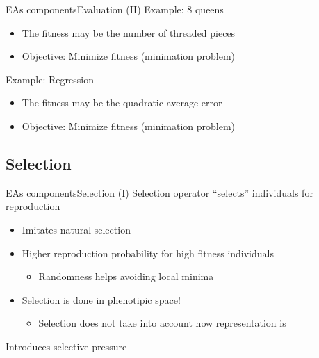 \documentclass[10pt,compress]{beamer} %
\begin{document}
\begin{frame}{EAs components}{Evaluation (II)} 
	Example: 8 queens
	\begin{itemize}
		\item The fitness may be the number of threaded pieces
		\item Objective: Minimize fitness (minimation problem)
	\end{itemize}
	Example: Regression
	\begin{itemize}
		\item The fitness may be the quadratic average error
		\item Objective: Minimize fitness (minimation problem)
	\end{itemize}
\end{frame}

\subsection{Selection}

\begin{frame}{EAs components}{Selection (I)} 
	Selection operator ``selects'' individuals for reproduction
	\begin{itemize}
		\item Imitates natural selection
		\item Higher reproduction probability for high fitness individuals
		\begin{itemize}
			\item Randomness helps avoiding local minima
		\end{itemize}
		\item Selection is done in phenotipic space!
		\begin{itemize}
			\item Selection does not take into account how representation is
		\end{itemize}
	\end{itemize}
	Introduces \alert{selective pressure}
\end{frame}
\end{document}
